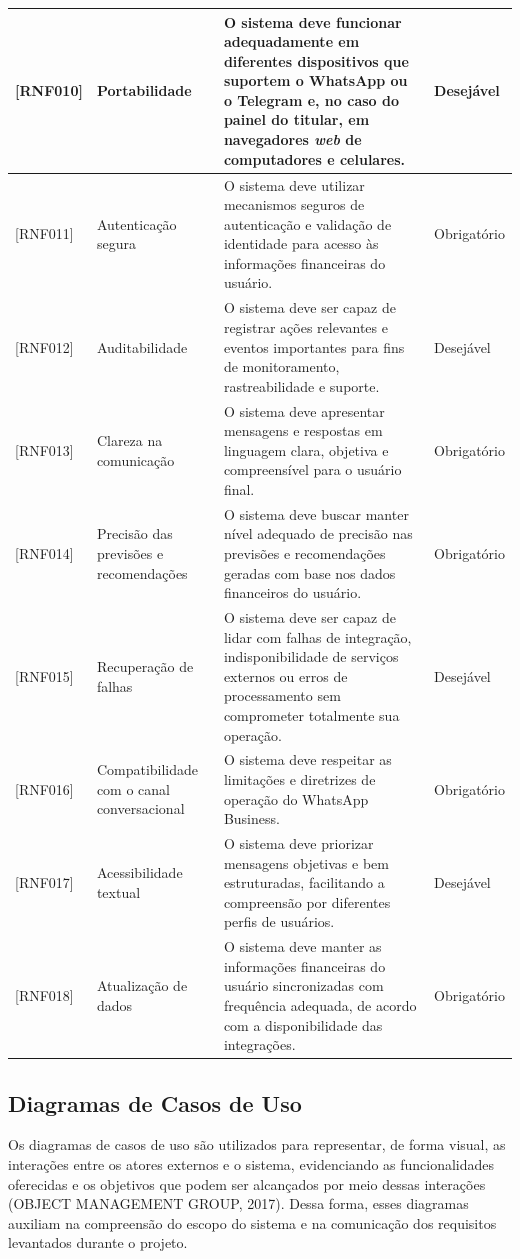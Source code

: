 \begin{longtable}{|L{1.8cm}|L{3.2cm}|L{7.0cm}|L{2.1cm}|}
{[RNF010]} & Portabilidade & O sistema deve funcionar adequadamente em diferentes dispositivos que suportem o WhatsApp ou o Telegram e, no caso do painel do titular, em navegadores \textit{web} de computadores e celulares. & Desejável \\ \hline
{[RNF011]} & Autenticação segura & O sistema deve utilizar mecanismos seguros de autenticação e validação de identidade para acesso às informações financeiras do usuário. & Obrigatório \\ \hline
{[RNF012]} & Auditabilidade & O sistema deve ser capaz de registrar ações relevantes e eventos importantes para fins de monitoramento, rastreabilidade e suporte. & Desejável \\ \hline
{[RNF013]} & Clareza na comunicação & O sistema deve apresentar mensagens e respostas em linguagem clara, objetiva e compreensível para o usuário final. & Obrigatório \\ \hline
{[RNF014]} & Precisão das previsões e recomendações & O sistema deve buscar manter nível adequado de precisão nas previsões e recomendações geradas com base nos dados financeiros do usuário. & Obrigatório \\ \hline
{[RNF015]} & Recuperação de falhas & O sistema deve ser capaz de lidar com falhas de integração, indisponibilidade de serviços externos ou erros de processamento sem comprometer totalmente sua operação. & Desejável \\ \hline
{[RNF016]} & Compatibilidade com o canal conversacional & O sistema deve respeitar as limitações e diretrizes de operação do WhatsApp Business. & Obrigatório \\ \hline
{[RNF017]} & Acessibilidade textual & O sistema deve priorizar mensagens objetivas e bem estruturadas, facilitando a compreensão por diferentes perfis de usuários. & Desejável \\ \hline
{[RNF018]} & Atualização de dados & O sistema deve manter as informações financeiras do usuário sincronizadas com frequência adequada, de acordo com a disponibilidade das integrações. & Obrigatório \\ \hline
\end{longtable}

\subsection{Diagramas de Casos de Uso}

Os diagramas de casos de uso são utilizados para representar, de forma visual, as interações entre os atores externos e o sistema, evidenciando as funcionalidades oferecidas e os objetivos que podem ser alcançados por meio dessas interações (OBJECT MANAGEMENT GROUP, 2017). Dessa forma, esses diagramas auxiliam na compreensão do escopo do sistema e na comunicação dos requisitos levantados durante o projeto.

